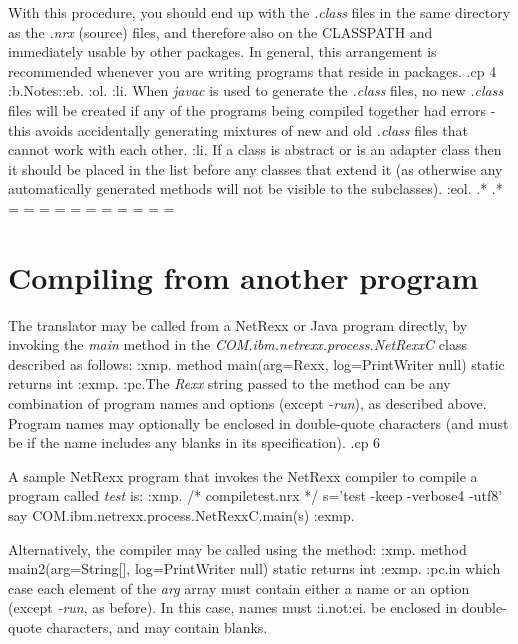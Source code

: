 With this procedure, you should end up with the \emph{.class} files in
the same directory as the \emph{.nrx} (source) files, and therefore also
on the CLASSPATH and immediately usable by other packages.  In general,
this arrangement is recommended whenever you are writing programs that
reside in packages.
.cp 4
:b.Notes::eb.
:ol.
:li.
When \emph{javac} is used to generate the \emph{.class} files, no
new \emph{.class} files will be created if any of the programs being
compiled together had errors - this avoids accidentally generating
mixtures of new and old \emph{.class} files that cannot work with each
other.
:li.
If a class is abstract or is an adapter class then it should be placed
in the list before any classes that extend it (as otherwise any
automatically generated methods will not be visible to the subclasses).
:eol.
.*
.* = = = = = = = = = = =
\section{Compiling from another program}

The translator may be called from a NetRexx or Java program directly, by
invoking the \emph{main} method in the \emph{COM.ibm.netrexx.process.NetRexxC}
class described as follows:
:xmp.
method main(arg=Rexx, log=PrintWriter null) static returns int
:exmp.
:pc.The \emph{Rexx} string passed to the method can be any combination of
program names and options (except \emph{-run}), as described above.
Program names may optionally be enclosed in double-quote characters (and
must be if the name includes any blanks in its specification).
.cp 6

A sample NetRexx program that invokes the NetRexx compiler to compile a
program called \emph{test} is:
:xmp.
/* compiletest.nrx */
s='test -keep -verbose4 -utf8'
say COM.ibm.netrexx.process.NetRexxC.main(s)
:exmp.

Alternatively, the compiler may be called using the method:
:xmp.
method main2(arg=String[], log=PrintWriter null) static returns int
:exmp.
:pc.in which case each element of the \emph{arg} array must contain
either a name or an option (except \emph{-run}, as before).  In this
case, names must :i.not:ei. be enclosed in double-quote characters, and
may contain blanks.

